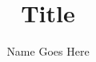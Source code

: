 \documentclass[14pt, aspectratio=169]{beamer}
\title{Title}
\author{Name Goes Here}
\begin{document}
\frame{\titlepage}
\end{document}
